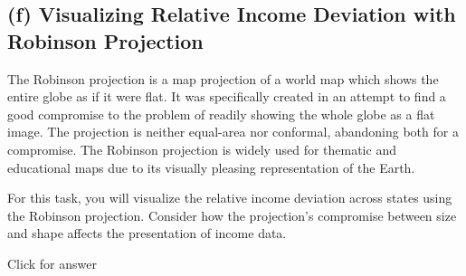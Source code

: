 \documentclass[
]{book}
\begin{document}
\hypertarget{f-visualizing-relative-income-deviation-with-robinson-projection}{%
\subsection{(f) Visualizing Relative Income Deviation with Robinson Projection}\label{f-visualizing-relative-income-deviation-with-robinson-projection}}

The Robinson projection is a map projection of a world map which shows the entire globe as if it were flat. It was specifically created in an attempt to find a good compromise to the problem of readily showing the whole globe as a flat image. The projection is neither equal-area nor conformal, abandoning both for a compromise. The Robinson projection is widely used for thematic and educational maps due to its visually pleasing representation of the Earth.

For this task, you will visualize the relative income deviation across states using the Robinson projection. Consider how the projection's compromise between size and shape affects the presentation of income data.

Click for answer
\end{document}

